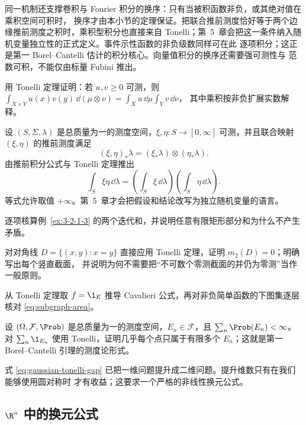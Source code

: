 同一机制还支撑卷积与 Fourier 积分的换序：只有当被积函数非负，或其绝对值在乘积空间可积时，
换序才由本小节的定理保证。把联合推前测度恰好等于两个边缘推前测度之积时，乘积型积分也直接来自
Tonelli；第~5~章会把这一条件纳入随机变量独立性的正式定义。事件示性函数的非负级数同样可在此
逐项积分；这正是第一 Borel--Cantelli 估计的积分核心。向量值积分的换序还需要强可测性与
范数可积，不能仅由标量 Fubini 推出。

\begin{exercise}
用 Tonelli 定理证明：若 $u,v\ge0$ 可测，则
$\int_{X\times Y}u(x)v(y)\,\dd(\mu\otimes\nu)=\int_Xu\,\dd\mu\int_Yv\,\dd\nu$，
其中乘积按非负扩展实数解释。
\end{exercise}
\begin{exercise}
设 $(S,\Sigma,\lambda)$ 是总质量为一的测度空间，$\xi,\eta:S\to[0,\infty]$ 可测，并且联合映射
$(\xi,\eta)$ 的推前测度满足
\[
  (\xi,\eta)_*\lambda=(\xi_*\lambda)\otimes(\eta_*\lambda).
\]
由推前积分公式与 Tonelli 定理推出
\[
  \int_S\xi\eta\,\dd\lambda
  =\left(\int_S\xi\,\dd\lambda\right)
   \left(\int_S\eta\,\dd\lambda\right).
\]
等式允许取值 $+\infty$。第~5~章才会把假设和结论改写为独立随机变量的语言。
\end{exercise}
\begin{exercise}
逐项核算例~\ref{ex:3-2-1-3} 的两个迭代和，并说明任意有限矩形部分和为什么不产生矛盾。
\end{exercise}
\begin{exercise}
对对角线 $D=\{(x,y):x=y\}$ 直接应用 Tonelli 定理，证明 $m_2(D)=0$；明确写出每个竖直截面，
并说明为何不需要把“不可数个零测截面的并仍为零测”当作一般原则。
\end{exercise}
\begin{exercise}
从 Tonelli 定理取 $f=\1_E$ 推导 Cavalieri 公式，再对非负简单函数的下图集逐层核对
\eqref{eq:subgraph-area}。
\end{exercise}
\begin{exercise}
设 $(\Omega,\mathcal F,\Prob)$ 是总质量为一的测度空间，$E_n\in\mathcal F$，且
$\sum_n\Prob(E_n)<\infty$。对
$\sum_n\1_{E_n}$ 使用 Tonelli，证明几乎每个点只属于有限多个 $E_n$；这就是第一
Borel--Cantelli 引理的测度论形式。
\end{exercise}

式 \eqref{eq:gaussian-tonelli-gap} 已把一维问题提升成二维问题。提升维数只有在我们能够使用圆对称时
才有收益；这要求一个严格的非线性换元公式。

\subsection{\texorpdfstring{$\R^n$}{R n} 中的换元公式}\label{subsec:3-2-2}

